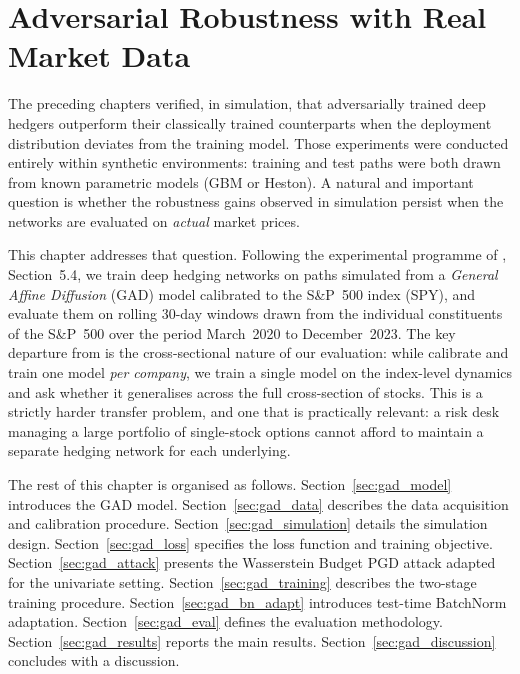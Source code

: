 
\chapter{Adversarial Robustness with Real Market Data}%
\label{ch:gad}

The preceding chapters verified, in simulation, that adversarially trained
deep hedgers outperform their classically trained counterparts when the
deployment distribution deviates from the training model.  Those experiments
were conducted entirely within synthetic environments: training and test paths
were both drawn from known parametric models (GBM or Heston).  A natural and
important question is whether the robustness gains observed in simulation
persist when the networks are evaluated on \emph{actual} market prices.

This chapter addresses that question.  Following the experimental programme of
\citet{he2025}, Section~5.4, we train deep hedging networks on paths simulated
from a \emph{General Affine Diffusion} (GAD) model calibrated to the S\&P~500
index (SPY), and evaluate them on rolling 30-day windows drawn from the
individual constituents of the S\&P~500 over the period March~2020 to
December~2023.  The key departure from \citet{he2025} is the cross-sectional
nature of our evaluation: while \citeauthor{he2025} calibrate and train one
model \emph{per company}, we train a single model on the index-level dynamics
and ask whether it generalises across the full cross-section of stocks.  This
is a strictly harder transfer problem, and one that is practically relevant:
a risk desk managing a large portfolio of single-stock options cannot afford
to maintain a separate hedging network for each underlying.

The rest of this chapter is organised as follows.  Section~\ref{sec:gad_model}
introduces the GAD model.
Section~\ref{sec:gad_data} describes the data acquisition and calibration
procedure.
Section~\ref{sec:gad_simulation} details the simulation design.
Section~\ref{sec:gad_loss} specifies the loss function and training objective.
Section~\ref{sec:gad_attack} presents the Wasserstein Budget PGD attack
adapted for the univariate setting.
Section~\ref{sec:gad_training} describes the two-stage training procedure.
Section~\ref{sec:gad_bn_adapt} introduces test-time BatchNorm adaptation.
Section~\ref{sec:gad_eval} defines the evaluation methodology.
Section~\ref{sec:gad_results} reports the main results.
Section~\ref{sec:gad_discussion} concludes with a discussion.

